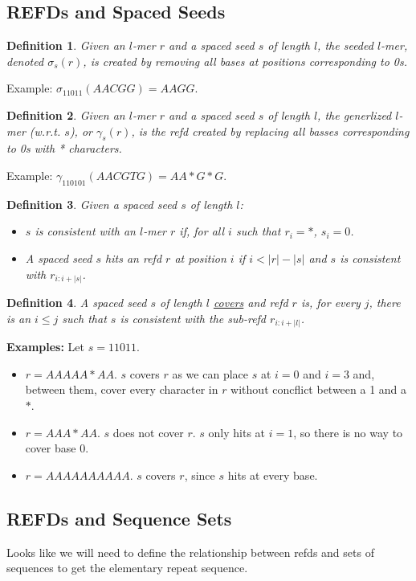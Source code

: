 \documentclass{article}
\newtheorem{definition}{Definition}
\begin{document}
\subsection{REFDs and Spaced Seeds}


\begin{definition}
Given an $l$-mer $r$ and a spaced seed $s$ of length $l$, the seeded
$l$-mer, denoted $\sigma_s(r)$, is created by removing all bases at
positions corresponding to 0s.
\end{definition}
Example: $\sigma_{11011}(AACGG) = AAGG$. 

\begin{definition}
\label{generalize}
Given an $l$-mer $r$ and a spaced seed $s$ of length $l$, the
generlized $l$-mer (w.r.t. $s$), or $\gamma_s(r)$, is the refd created by replacing
all basses corresponding to 0s with * characters.
\end{definition}
Example: $\gamma_{110101}(AACGTG) = AA*G*G$.

\begin{definition}
Given a spaced seed $s$ of length $l$: 
\begin{itemize}
\item $s$ is {\it consistent} with an $l$-mer $r$ if, for all
$i$ such that $r_i = *$, $s_i = 0$.  
\item A spaced seed $s$ hits an refd $r$ at position $i$ if 
  $i <|r|-|s|$ and $s$ is consistent with $r_{i:i+|s|}$.
\end{itemize}
\end{definition}

\begin{definition} 
A spaced seed $s$ of length $l$ \underline{covers} and refd $r$ is, for every $j$,
there is an $i \leq j$ such that $s$ is consistent with the sub-refd
$r_{i:i+|l|}$.
\end{definition}
{\bf Examples:} Let $s = 11011$.
\begin{itemize}
\item $r = AAAAA*AA$. $s$ covers $r$ as we can place $s$ at $i=0$ and
  $i=3$ and, between them, cover every character in $r$ without
  concflict between a 1 and a $*$.
\item $r = AAA*AA$.  $s$ does not cover $r$.  $s$ only hits at $i=1$,
  so there is no way to cover base 0.
\item $r = AAAAAAAAAA$.  $s$ covers $r$, since $s$ hits at every base.
\end{itemize}

\subsection{REFDs and Sequence Sets}
Looks like we will need to define the relationship between refds and
sets of sequences to get the elementary repeat sequence.
\end{document}

